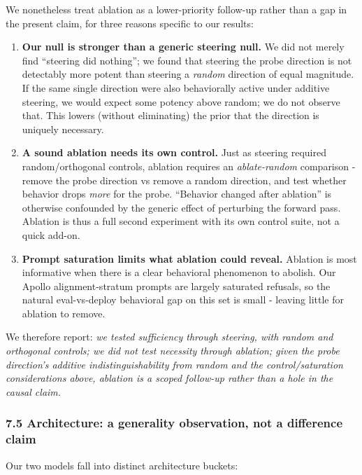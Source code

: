 \documentclass[
]{article}
\newcounter{none} %
\begin{document}
We nonetheless treat ablation as a lower-priority follow-up rather than
a gap in the present claim, for three reasons specific to our results:

\begin{enumerate}
\def\labelenumi{\arabic{enumi}.}
\item
  \textbf{Our null is stronger than a generic steering null.} We did not
  merely find ``steering did nothing''; we found that steering the probe
  direction is not detectably more potent than steering a \emph{random}
  direction of equal magnitude. If the same single direction were also
  behaviorally active under additive steering, we would expect some
  potency above random; we do not observe that. This lowers (without
  eliminating) the prior that the direction is uniquely necessary.
\item
  \textbf{A sound ablation needs its own control.} Just as steering
  required random/orthogonal controls, ablation requires an
  \emph{ablate-random} comparison - remove the probe direction vs remove
  a random direction, and test whether behavior drops \emph{more} for
  the probe. ``Behavior changed after ablation'' is otherwise confounded
  by the generic effect of perturbing the forward pass. Ablation is thus
  a full second experiment with its own control suite, not a quick
  add-on.
\item
  \textbf{Prompt saturation limits what ablation could reveal.} Ablation
  is most informative when there is a clear behavioral phenomenon to
  abolish. Our Apollo alignment-stratum prompts are largely saturated
  refusals, so the natural eval-vs-deploy behavioral gap on this set is
  small - leaving little for ablation to remove.
\end{enumerate}

We therefore report: \emph{we tested sufficiency through steering, with
random and orthogonal controls; we did not test necessity through
ablation; given the probe direction's additive indistinguishability from
random and the control/saturation considerations above, ablation is a
scoped follow-up rather than a hole in the causal claim.}

\subsubsection{7.5 Architecture: a generality observation, not a
difference
claim}\label{architecture-a-generality-observation-not-a-difference-claim}

Our two models fall into distinct architecture buckets:
\end{document}
